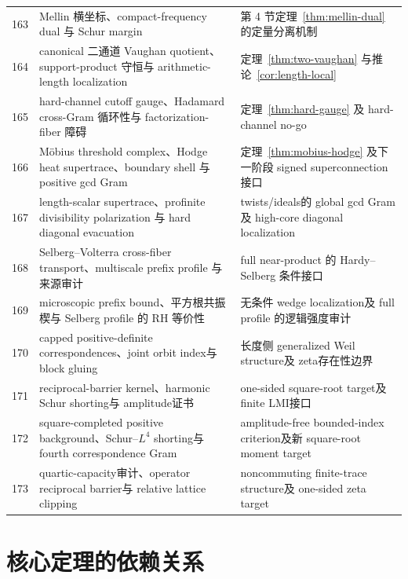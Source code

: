 \documentclass[UTF8,11pt,a4paper]{ctexart}
\theoremstyle{definition}
\theoremstyle{remark}
\newcommand{\1}{\mathbf 1}
\begin{document}
\begin{longtable}{@{}p{}p{}p{}@{}}
163 & Mellin 横坐标、compact-frequency dual 与 Schur margin & 第 4 节定理~\ref{thm:mellin-dual} 的定量分离机制\\
164 & canonical 二通道 Vaughan quotient、support-product 守恒与 arithmetic-length localization & 定理~\ref{thm:two-vaughan} 与推论~\ref{cor:length-local}\\
165 & hard-channel cutoff gauge、Hadamard cross-Gram 循环性与 factorization-fiber 障碍 & 定理~\ref{thm:hard-gauge} 及 hard-channel no-go\\
166 & M\"obius threshold complex、Hodge heat supertrace、boundary shell 与 positive gcd Gram & 定理~\ref{thm:mobius-hodge} 及下一阶段 signed superconnection 接口\\
167 & length-scalar supertrace、profinite divisibility polarization 与 hard diagonal evacuation & twists/ideals的 global gcd Gram及 high-core diagonal localization\\
168 & Selberg--Volterra cross-fiber transport、multiscale prefix profile 与来源审计 & full near-product 的 Hardy--Selberg 条件接口\\
169 & microscopic prefix bound、平方根共振楔与 Selberg profile 的 RH 等价性 & 无条件 wedge localization及 full profile 的逻辑强度审计\\
170 & capped positive-definite correspondences、joint orbit index与 block gluing & 长度侧 generalized Weil structure及 zeta存在性边界\\
171 & reciprocal-barrier kernel、harmonic Schur shorting与 amplitude证书 & one-sided square-root target及 finite LMI接口\\
172 & square-completed positive background、Schur--$L^4$ shorting与 fourth correspondence Gram & amplitude-free bounded-index criterion及新 square-root moment target\\
173 & quartic-capacity审计、operator reciprocal barrier与 relative lattice clipping & noncommuting finite-trace structure及 one-sided zeta target\\
\bottomrule
\end{longtable}
\endgroup

\section{核心定理的依赖关系}
\end{document}
